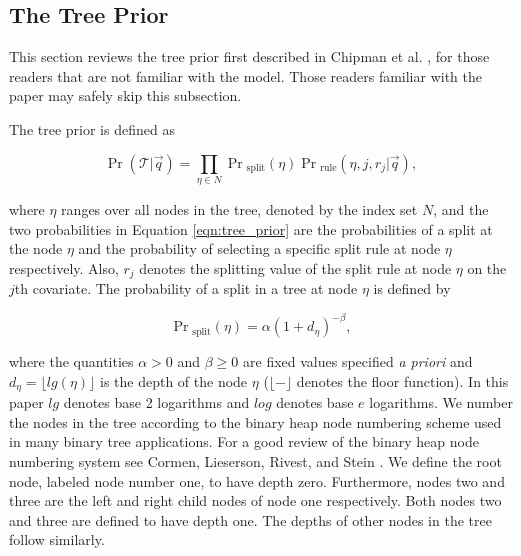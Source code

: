 \subsection{The Tree Prior}\label{subsec:the_tp}	
This section reviews the tree prior first described in Chipman et al. \cite{chipman1998bayesian}, for those readers that are not familiar with the model. Those readers familiar with the paper may safely skip this subsection. 

The tree prior is defined as

\begin{equation} \label{eqn:tree_prior}
\Pr(\mathcal{T}\vert \vec{q}) = \prod_{\eta\in N} \Pr{_{\text{split}}} (\eta) \Pr{_{\text{rule}}}(\eta,j,r_j \vert \vec{q} ),
\end{equation}

\noindent where $\eta$ ranges over all nodes in the tree, denoted by the index set $N$, and the two probabilities in Equation \ref{eqn:tree_prior} are the probabilities of a split at the node $\eta$ and the probability of selecting a specific split rule at node $\eta$ respectively. Also, $r_j$ denotes the splitting value of the split rule at node $\eta$ on the $j$th covariate. The probability of a split in a tree at node $\eta$ is defined by 
 
 \begin{equation}\label{eqn:psplit}
 \Pr{_\text{split}}(\eta)= \alpha(1+d_\eta)^{-\beta},
 \end{equation}
 
\noindent where the quantities $\alpha>0$ and $\beta\geq0$ are fixed values specified \emph{a priori} and $d_\eta = \lfloor lg(\eta)\rfloor$ is the depth of the node $\eta$ ($\lfloor - \rfloor$ denotes the floor function). In this paper $lg$ denotes base 2 logarithms and $log$ denotes base $e$ logarithms. We number the nodes in the tree according to the binary heap node numbering scheme used in many binary tree applications. For a good review of the binary heap node numbering system see Cormen, Lieserson, Rivest, and Stein \cite{cormen2001introduction}. We define the root node, labeled node number one, to have depth zero. Furthermore,  nodes two and three are the left and right child nodes of node one respectively. Both nodes two and three are defined to have depth one. The depths of other nodes in the tree follow similarly.   

